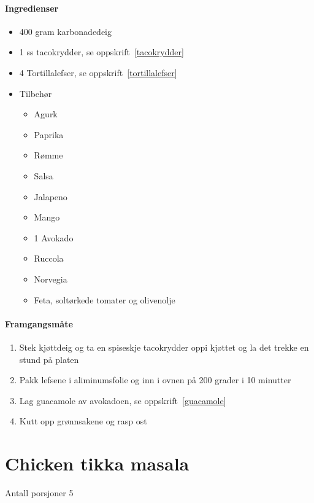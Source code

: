 \documentclass[12pt,a4paper]{book}
\begin{document}
{\paragraph{Ingredienser}
\begin{itemize}[noitemsep]
	\item 400 gram karbonadedeig
	\item 1 ss tacokrydder, se oppskrift~\ref{tacokrydder}
	\item 4 Tortillalefser, se oppskrift~\ref{tortillalefser}
	\item Tilbehør
		\begin{itemize}[noitemsep]
			\item Agurk
			\item Paprika
			\item Rømme
			\item Salsa
			\item Jalapeno
			\item Mango
			\item 1 Avokado
			\item Ruccola
			\item Norvegia
			\item Feta, soltørkede tomater og olivenolje
			\end{itemize}
\end{itemize}

\paragraph{Framgangsmåte}
\begin{enumerate}[noitemsep]
	\item Stek kjøttdeig og ta en spiseskje tacokrydder oppi kjøttet og la det trekke en stund på platen
	\item Pakk lefsene i aliminumsfolie og inn i ovnen på 200 grader i 10 minutter
	\item Lag guacamole av avokadoen, se oppskrift~\ref{guacamole}
	\item Kutt opp grønnsakene og rasp ost
\end{enumerate}
\clearpage{}
\clearpage{}\section{﻿Chicken tikka masala}
Antall porsjoner 5

}
\end{document}
